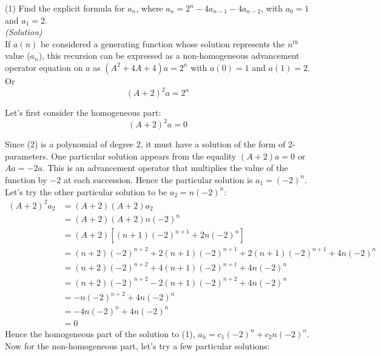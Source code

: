 (1) Find the explicit formula for $a_n$, where
    $a_n = 2^n - 4a_{n-1} - 4a_{n-2}$, with
    $a_0 = 1$ and $a_1 = 2$.\\

    \textit{(Solution)}\\

    If $a(n)$ be considered a generating function
    whose solution represents the $n^{th}$ value ($a_n$),
    this recursion can be expressed as a
    non-homogeneous advancement operator
    equation on $a$ as $(A^2+4A+4)a = 2^n$
    with $a(0)=1$ and $a(1)=2$. Or
    \begin{equation}
        (A+2)^2a=2^n
    \end{equation}
    
    Let's first consider the homogeneous part:
    \begin{equation}
        (A+2)^2a=0
    \end{equation}
    
    Since (2) is a polynomial of degree
    2, it must have a solution of the form of 2-parameters.
    One particular solution appears from the equality
    $(A+2)a=0$ or $Aa = -2a$. This is an advancement operator
    that multiplies the value of the function by $-2$
    at each succession. Hence the particular solution
    is $a_1=(-2)^n$. Let's try the other particular solution to be
    $a_2=n(-2)^n$:
    \begin{align*}
        (A+2)^2a_2 &= (A+2)(A+2)a_2\\
        &= (A+2)(A+2)n(-2)^n\\
        &= (A+2)\left[
            (n+1)(-2)^{n+1} + 2n(-2)^n
            \right]\\
        &= (n+2)(-2)^{n+2} + 2(n+1)(-2)^{n+1}
        + 2(n+1)(-2)^{n+1} + 4n(-2)^n\\
        &= (n+2)(-2)^{n+2} 
        + 4(n+1)(-2)^{n+1}
        + 4n(-2)^n\\
        &= (n+2)(-2)^{n+2} 
        - 2(n+1)(-2)^{n+2}
        + 4n(-2)^n\\
        &= -n(-2)^{n+2} 
        + 4n(-2)^n\\
        &= -4n(-2)^{n} 
        + 4n(-2)^n\\
        &= 0
    \end{align*}
    Hence the homogeneous part of the solution to (1),
    $a_h=c_1(-2)^n + c_2n(-2)^n$. Now for the non-homogeneous
    part, let's try a few particular solutions:\\

